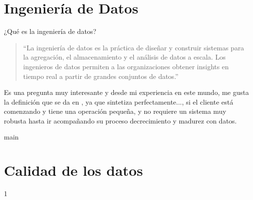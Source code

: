 \chapter{Ingeniería de Datos}
¿Qué es la ingeniería de datos?
\begin{quote}
``La ingeniería de datos es la práctica de diseñar y construir sistemas para la agregación, el almacenamiento y el análisis de datos a escala. Los ingenieros de datos permiten a las organizaciones obtener insights en tiempo real a partir de grandes conjuntos de datos.'' \cite{ibm_data_engineering}
\end{quote}

Es una pregunta muy interesante y desde mi experiencia en este mundo, me gusta la definición que se da en \cite{ibm_data_engineering}, ya que sintetiza perfectamente..., si el cliente está comenzando y tiene una operación pequeña, y no requiere un sistema muy robusta 
hasta ir acompañando su proceso decrecimiento y madurez con datos. 

{main}
\chapter{Calidad de los datos}
{1}
